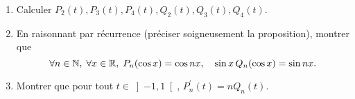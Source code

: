 \begin{enumerate}
\item  Calculer $P_{2}(t),P_{3}(t),P_{4}(t),Q_{2}(t),Q_{3}(t),Q_{4}(t)$.

\item  En raisonnant par récurrence (préciser soigneusement la proposition), montrer que
\[
\forall n \in \mathbb{N}, \; \forall x \in  \mathbb{R}, \; P_{n}(\cos x)=\cos nx,\quad \sin x\,Q_{n}(\cos x)=\sin nx.
\]


\item  Montrer que pour tout $t\in \left] -1,1\right[ $, $P_{n}^{\prime }(t)=nQ_{n}(t)$.
\end{enumerate}
